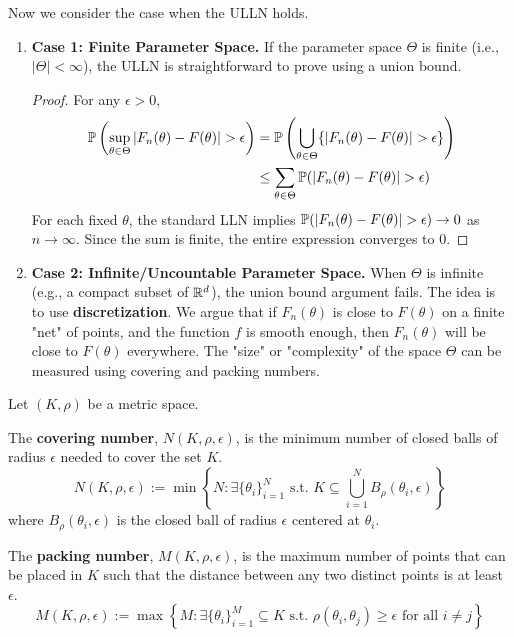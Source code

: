 Now we consider the case when the ULLN holds.
\begin{enumerate}
    \item \textbf{Case 1: Finite Parameter Space.}
If the parameter space $\Theta$ is finite (i.e., $|\Theta| < \infty$), the ULLN is straightforward to prove using a union bound.
\begin{proof}
For any $\epsilon > 0$,
\begin{align*}
    \mathbb{P}\left( \sup_{\theta \in \Theta} |F_n(\theta) - F(\theta)| > \epsilon \right) &= \mathbb{P}\left( \bigcup_{\theta \in \Theta} \{|F_n(\theta) - F(\theta)| > \epsilon\} \right) \\
    &\le \sum_{\theta \in \Theta} \mathbb{P}(|F_n(\theta) - F(\theta)| > \epsilon)
\end{align*} 
For each fixed $\theta$, the standard LLN implies $\mathbb{P}(|F_n(\theta) - F(\theta)| > \epsilon) \to 0$ as $n \to \infty$. Since the sum is finite, the entire expression converges to 0.
\end{proof}
\item \textbf{Case 2: Infinite/Uncountable Parameter Space.}
When $\Theta$ is infinite (e.g., a compact subset of $\mathbb{R}^d$), the union bound argument fails. The idea is to use \textbf{discretization}. We argue that if $F_n(\theta)$ is close to $F(\theta)$ on a finite "net" of points, and the function $f$ is smooth enough, then $F_n(\theta)$ will be close to $F(\theta)$ everywhere. The "size" or "complexity" of the space $\Theta$ can be measured using covering and packing numbers.
\end{enumerate}
Let $(K, \rho)$ be a metric space.
\begin{de}
The \textbf{covering number}, $N(K, \rho, \epsilon)$, is the minimum number of closed balls of radius $\epsilon$ needed to cover the set $K$.
$$ N(K, \rho, \epsilon) := \min \left\{ N : \exists \{\theta_i\}_{i=1}^N \text{ s.t. } K \subseteq \bigcup_{i=1}^N B_{\rho}(\theta_i, \epsilon) \right\} $$
where $B_{\rho}(\theta_i, \epsilon)$ is the closed ball of radius $\epsilon$ centered at $\theta_i$.
\end{de}

\begin{de}
The \textbf{packing number}, $M(K, \rho, \epsilon)$, is the maximum number of points that can be placed in $K$ such that the distance between any two distinct points is at least $\epsilon$.
$$ M(K, \rho, \epsilon) := \max \left\{ M : \exists \{\theta_i\}_{i=1}^M \subseteq K \text{ s.t. } \rho(\theta_i, \theta_j) \ge \epsilon \text{ for all } i \ne j \right\} $$
\end{de}

